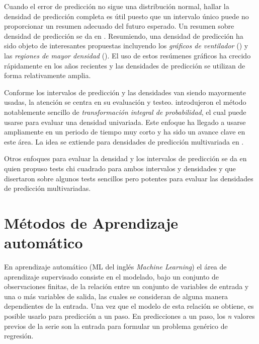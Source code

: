 \documentclass{llncs}
\begin{document}
Cuando el error de predicción no sigue una distribución normal, hallar la densidad de predicción completa es útil puesto que un intervalo único puede no proporcionar un resumen adecuado del futuro esperado. Un resumen sobre densidad de predicción se da en  \cite{Tay2000235}. Resumiendo, una densidad de predicción ha sido objeto de interesantes propuestas incluyendo los \emph{gráficos de ventilador}  (\cite{Wallis1999106}) y las \emph{regiones de mayor densidad} (\cite{Hyndman1995431}). El uso de estos resúmenes gráficos ha crecido rápidamente en los años recientes y las densidades de predicción se utilizan de forma relativamente amplia.

Conforme los intervalos de predicción y las densidades van siendo mayormente usadas, la atención se centra en su evaluación y testeo. \cite{Diebold1998863} introdujeron el método notablemente sencillo de \emph{transformación integral de probabilidad}, el cual puede usarse para evaluar una densidad univariada. Este enfoque ha llegado a usarse ampliamente en un periodo de tiempo muy corto y ha sido un avance clave en este área. La idea se extiende para densidades de predicción multivariada en \cite{Diebold1999661}.

Otros enfoques para evaluar la densidad y los intervalos de predicción se da en \cite{Wallis2003165} quien propuso tests chi cuadrado para ambos intervalos y densidades y \cite{Clements2002397} que disertaron sobre algunos tests sencillos pero potentes para evaluar las densidades de predicción multivariadas.


\section{Métodos de Aprendizaje automático}
En aprendizaje automático (ML del inglés \emph{Machine Learning}) el área de aprendizaje supervisado consiste en el modelado, bajo un conjunto de observaciones finitas, de la relación entre un conjunto de variables de entrada y una o más variables de salida, las cuales se consideran de alguna manera dependientes de la entrada. Una vez que el modelo de esta relación se obtiene, es posible usarlo para predicción a un paso. En predicciones a un paso, los \emph{n} valores previos de la serie son la entrada para formular un problema genérico de regresión. 
\end{document}

